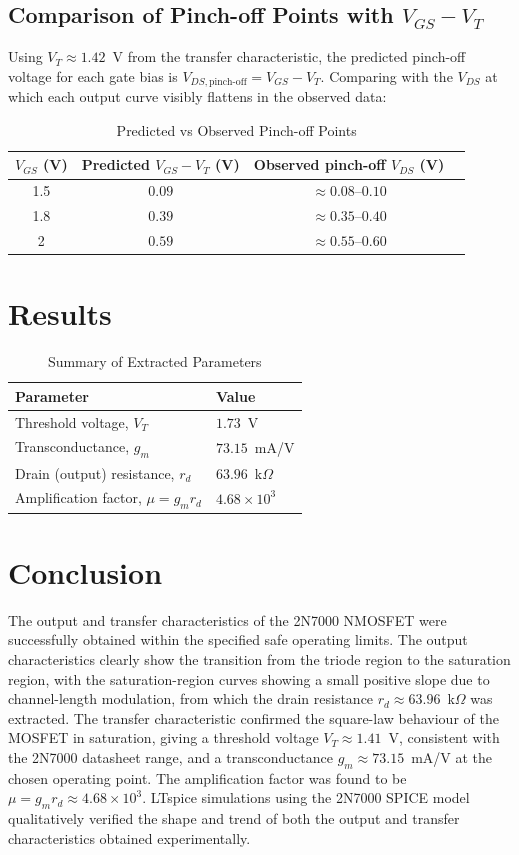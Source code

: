 \documentclass[12pt,a4paper]{article}
\begin{document}
\subsection{Comparison of Pinch-off Points with $V_{GS}-V_T$}
Using $V_T \approx 1.42$~V from the transfer characteristic, the predicted pinch-off voltage for each gate bias is $V_{DS,\text{pinch-off}} = V_{GS}-V_T$. Comparing with the $V_{DS}$ at which each output curve visibly flattens in the observed data:

\begin{table}[H]
\centering
\caption{Predicted vs Observed Pinch-off Points}
\begin{tabular}{@{}cccc@{}}
\toprule
$V_{GS}$ (V) & Predicted $V_{GS}-V_T$ (V) & Observed pinch-off $V_{DS}$ (V) \\
\midrule
1.5 & $0.09$ & $\approx 0.08$--$0.10$  \\
1.8 & $0.39$  & $\approx 0.35$--$0.40$ \\
2 & $0.59$  & $\approx 0.55$--$0.60$\\
\bottomrule
\end{tabular}
\end{table}



\section{Results}
\begin{table}[H]
\centering
\caption{Summary of Extracted Parameters}
\begin{tabular}{@{}ll@{}}
\toprule
Parameter & Value \\
\midrule
Threshold voltage, $V_T$ & $1.73$~V \\
Transconductance, $g_m$ & $73.15$~mA/V \\
Drain (output) resistance, $r_d$ & $63.96$~k$\Omega$ \\
Amplification factor, $\mu = g_m r_d$ & $4.68 \times 10^{3}$ \\
\bottomrule
\end{tabular}
\end{table}

\section{Conclusion}
The output and transfer characteristics of the 2N7000 NMOSFET were successfully obtained within the specified safe operating limits. The output characteristics clearly show the transition from the triode region to the saturation region, with the saturation-region curves showing a small positive slope due to channel-length modulation, from which the drain resistance $r_d \approx 63.96$~k$\Omega$ was extracted. The transfer characteristic confirmed the square-law behaviour of the MOSFET in saturation, giving a threshold voltage $V_T \approx 1.41$~V, consistent with the 2N7000 datasheet range, and a transconductance $g_m \approx 73.15$~mA/V at the chosen operating point. The amplification factor was found to be $\mu = g_m r_d \approx 4.68\times 10^3$. LTspice simulations using the 2N7000 SPICE model qualitatively verified the shape and trend of both the output and transfer characteristics obtained experimentally.
\end{document}
